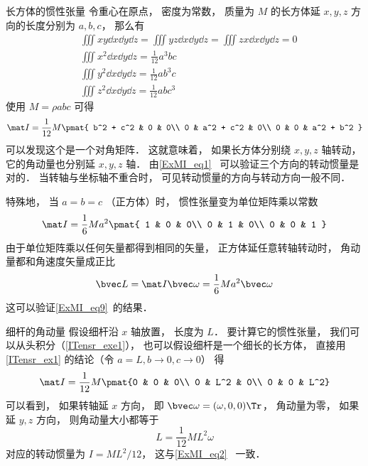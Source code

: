 \begin{example}{长方体的惯性张量}\label{ITensr_ex1}
令重心在原点， 密度为常数， 质量为 $M$ 的长方体延 $x, y, z$ 方向的长度分别为 $a, b, c$， 那么有
\begin{equation}
\begin{aligned}
&\iiint xy \dd{x}\dd{y}\dd{z} = \iiint yz \dd{x}\dd{y}\dd{z} = \iiint zx \dd{x}\dd{y}\dd{z} = 0\\
&\iiint x^2 \dd{x}\dd{y}\dd{z} = \frac{1}{12} a^3 bc\\
&\iiint y^2 \dd{x}\dd{y}\dd{z} = \frac{1}{12} ab^3 c\\
&\iiint z^2 \dd{x}\dd{y}\dd{z} = \frac{1}{12} ab c^3
\end{aligned}
\end{equation}
使用 $M = \rho abc$ 可得
\begin{equation}\label{ITensr_eq4}
\mat I = \frac{1}{12} M
\pmat{
   b^2 + c^2 & 0 & 0\\
   0 & a^2 + c^2 & 0\\
   0 & 0 & a^2 + b^2
}
\end{equation}
可以发现这个是一个对角矩阵． 这就意味着， 如果长方体分别绕 $x, y, z$ 轴转动， 它的角动量也分别延 $x, y, z$ 轴． 由\autoref{ExMI_eq1}~ 可以验证三个方向的转动惯量是对的． 当转轴与坐标轴不重合时， 可见转动惯量的方向与转动方向一般不同．

特殊地， 当 $a = b = c$ （正方体）时， 惯性张量变为单位矩阵乘以常数
\begin{equation}
\mat I = \frac{1}{6} Ma^2
\pmat{
   1 & 0 & 0\\
   0 & 1 & 0\\
   0 & 0 & 1
}
\end{equation}
由于单位矩阵乘以任何矢量都得到相同的矢量， 正方体延任意转轴转动时， 角动量都和角速度矢量成正比
\begin{equation}
\bvec L = \mat I \bvec \omega = \frac{1}{6} Ma^2 \bvec \omega
\end{equation}
这可以验证\autoref{ExMI_eq9}~的结果．
\end{example}

\begin{example}{细杆的角动量}
假设细杆沿 $x$ 轴放置， 长度为 $L$． 要计算它的惯性张量， 我们可以从头积分（\autoref{ITensr_exe1}）， 也可以假设细杆是一个细长的长方体， 直接用\autoref{ITensr_ex1} 的结论（令 $a = L, b \to 0, c \to 0$） 得
\begin{equation}\label{ITensr_eq5}
\mat I = \frac{1}{12} M \pmat{0 & 0 & 0\\ 0 & L^2 & 0\\ 0 & 0 & L^2}
\end{equation}
可以看到， 如果转轴延 $x$ 方向， 即 $\bvec\omega = (\omega, 0, 0)\Tr$， 角动量为零， 如果延 $y, z$ 方向， 则角动量大小都等于
\begin{equation}
L = \frac{1}{12} M L^2 \omega
\end{equation}
对应的转动惯量为 $I = ML^2/12$， 这与\autoref{ExMI_eq2}~ 一致．
\end{example}

